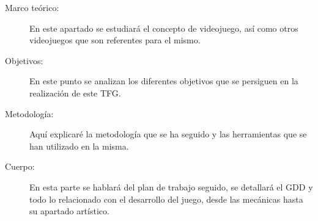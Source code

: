 \begin{description}
\item[Marco teórico:] En este apartado se estudiará el concepto de videojuego, así como otros videojuegos que son referentes para el mismo.
\item[Objetivos:] En este punto se analizan los diferentes objetivos que se persiguen en la realización de este \ac{TFG}.
\item[Metodología:] Aquí explicaré la metodología que se ha seguido y las herramientas que se han utilizado en la misma.
\item[Cuerpo:] En esta parte se hablará del plan de trabajo seguido, se detallará el \ac{GDD} y todo lo relacionado con el desarrollo del juego, desde las mecánicas hasta su apartado artístico.



\begin{comment}



\end{comment}
\end{description}
